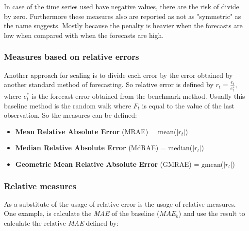 In case of the time series used have negative values, there are the risk of
divide by zero. Furthermore these measures also are reported as not as
"symmetric" as the name suggests. Mostly because the penalty is heavier when the
forecasts are low when compared with when the forecasts are high. \cite{Goodwin1999405}

\subsubsection{Measures based on relative errors}

Another approach for scaling is to divide each error by the error obtained by
another standard method of forecasting. So relative error is defined by
\begin{math} r_t = \frac{e_t}{e_t^*} \end{math}, where \begin{math} e_t^*
\end{math} is the forecast error obtained from the benchmark method. Usually
this baseline method is the random walk where \begin{math}F_t\end{math} is equal
to the value of the last observation.
So the measures can be defined:
\begin{itemize}
  \item \textbf{Mean Relative Absolute Error} (MRAE) =
  mean(\begin{math}\left|r_t\right|\end{math})
  \item \textbf{Median Relative Absolute Error} (MdRAE) =
  median(\begin{math}\left|r_t\right|\end{math})
  \item \textbf{Geometric Mean Relative Absolute Error} (GMRAE) =
  gmean(\begin{math}\left|r_t\right|\end{math})
\end{itemize}

\subsubsection{Relative measures}

As a substitute of the usage of relative error is the usage of relative
measures. One example, is calculate the \emph{MAE} of the baseline
(\begin{math}MAE_b\end{math}) and use the result to calculate the relative
\emph{MAE} defined by:
\\

